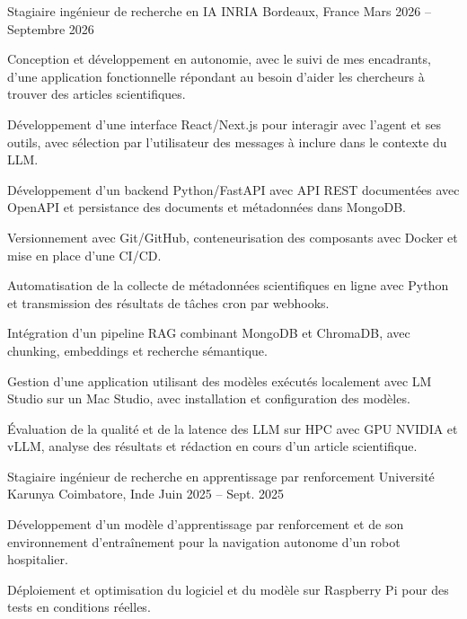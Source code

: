 
\begin{cventries}
  \cventry
    {Stagiaire ingénieur de recherche en IA}
    {INRIA}
    {Bordeaux, France}
    {Mars 2026 -- Septembre 2026}
    {
      \begin{cvitems}
        \item {Conception et développement en autonomie, avec le suivi de mes encadrants, d’une application fonctionnelle répondant au besoin d’aider les chercheurs à trouver des articles scientifiques.}
        \item {Développement d’une interface React/Next.js pour interagir avec l’agent et ses outils, avec sélection par l’utilisateur des messages à inclure dans le contexte du LLM.}
        \item {Développement d’un backend Python/FastAPI avec API REST documentées avec OpenAPI et persistance des documents et métadonnées dans MongoDB.}
        \item {Versionnement avec Git/GitHub, conteneurisation des composants avec Docker et mise en place d’une CI/CD.}
        \item {Automatisation de la collecte de métadonnées scientifiques en ligne avec Python et transmission des résultats de tâches cron par webhooks.}
        \item {Intégration d’un pipeline RAG combinant MongoDB et ChromaDB, avec chunking, embeddings et recherche sémantique.}
        \item {Gestion d’une application utilisant des modèles exécutés localement avec LM Studio sur un Mac Studio, avec installation et configuration des modèles.}
        \item {Évaluation de la qualité et de la latence des LLM sur HPC avec GPU NVIDIA et vLLM, analyse des résultats et rédaction en cours d’un article scientifique.}
      \end{cvitems}
    }

  \cventry
    {Stagiaire ingénieur de recherche en apprentissage par renforcement}
    {Université Karunya}
    {Coimbatore, Inde}
    {Juin 2025 -- Sept. 2025}
    {
      \begin{cvitems}
        \item {Développement d’un modèle d’apprentissage par renforcement et de son environnement d’entraînement pour la navigation autonome d’un robot hospitalier.}
        \item {Déploiement et optimisation du logiciel et du modèle sur Raspberry Pi pour des tests en conditions réelles.}
      \end{cvitems}
    }
\end{cventries}
